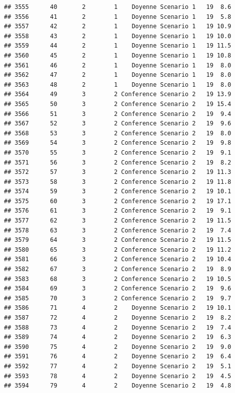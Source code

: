 \documentclass[
]{article}
\begin{document}
\begin{verbatim}
## 3555      40       2        1    Doyenne Scenario 1   19  8.6
## 3556      41       2        1    Doyenne Scenario 1   19  5.8
## 3557      42       2        1    Doyenne Scenario 1   19 10.9
## 3558      43       2        1    Doyenne Scenario 1   19 10.0
## 3559      44       2        1    Doyenne Scenario 1   19 11.5
## 3560      45       2        1    Doyenne Scenario 1   19 10.8
## 3561      46       2        1    Doyenne Scenario 1   19  8.0
## 3562      47       2        1    Doyenne Scenario 1   19  8.0
## 3563      48       2        1    Doyenne Scenario 1   19  8.0
## 3564      49       3        2 Conference Scenario 2   19 13.9
## 3565      50       3        2 Conference Scenario 2   19 15.4
## 3566      51       3        2 Conference Scenario 2   19  9.4
## 3567      52       3        2 Conference Scenario 2   19  9.6
## 3568      53       3        2 Conference Scenario 2   19  8.0
## 3569      54       3        2 Conference Scenario 2   19  9.8
## 3570      55       3        2 Conference Scenario 2   19  9.1
## 3571      56       3        2 Conference Scenario 2   19  8.2
## 3572      57       3        2 Conference Scenario 2   19 11.3
## 3573      58       3        2 Conference Scenario 2   19 11.8
## 3574      59       3        2 Conference Scenario 2   19 10.1
## 3575      60       3        2 Conference Scenario 2   19 17.1
## 3576      61       3        2 Conference Scenario 2   19  9.1
## 3577      62       3        2 Conference Scenario 2   19 11.5
## 3578      63       3        2 Conference Scenario 2   19  7.4
## 3579      64       3        2 Conference Scenario 2   19 11.5
## 3580      65       3        2 Conference Scenario 2   19 11.2
## 3581      66       3        2 Conference Scenario 2   19 10.4
## 3582      67       3        2 Conference Scenario 2   19  8.9
## 3583      68       3        2 Conference Scenario 2   19 10.5
## 3584      69       3        2 Conference Scenario 2   19  9.6
## 3585      70       3        2 Conference Scenario 2   19  9.7
## 3586      71       4        2    Doyenne Scenario 2   19 10.1
## 3587      72       4        2    Doyenne Scenario 2   19  8.2
## 3588      73       4        2    Doyenne Scenario 2   19  7.4
## 3589      74       4        2    Doyenne Scenario 2   19  6.3
## 3590      75       4        2    Doyenne Scenario 2   19  9.0
## 3591      76       4        2    Doyenne Scenario 2   19  6.4
## 3592      77       4        2    Doyenne Scenario 2   19  5.1
## 3593      78       4        2    Doyenne Scenario 2   19  4.5
## 3594      79       4        2    Doyenne Scenario 2   19  4.8

\end{verbatim}
\end{document}
